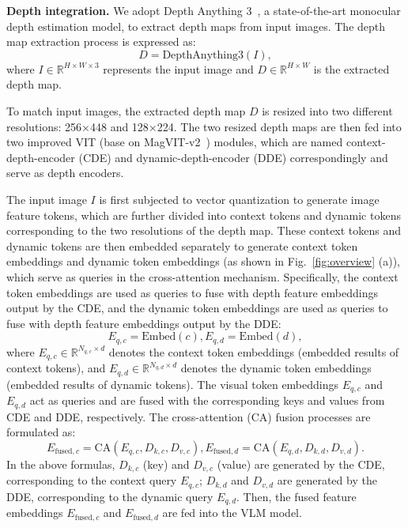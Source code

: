 \documentclass[runningheads]{llncs}
\begin{document}
\noindent\textbf{Depth integration.}
We adopt Depth Anything 3~\cite{lin2025depth3recoveringvisual}, a state-of-the-art monocular depth estimation model, to extract depth maps from input images. The depth map extraction process is expressed as:
\begin{equation}
D = \text{DepthAnything3}(I),
\end{equation}
where $I \in \mathbb{R}^{H \times W \times 3}$ represents the input image and $D \in \mathbb{R}^{H \times W}$ is the extracted depth map.

To match input images, the extracted depth map $D$ is resized into two different resolutions: 256×448 and 128×224. The two resized depth maps are then fed into two improved VIT (base on MagVIT-v2~\cite{yu2024magvitv2}) modules, which are named context-depth-encoder (CDE) and dynamic-depth-encoder (DDE) correspondingly and serve as depth encoders.

The input image $I$ is first subjected to vector quantization to generate image feature tokens, which are further divided into context tokens and dynamic tokens corresponding to the two resolutions of the depth map. These context tokens and dynamic tokens are then embedded separately to generate context token embeddings and dynamic token embeddings (as shown in Fig.~\ref{fig:overview} (a)), which serve as queries in the cross-attention mechanism. Specifically, the context token embeddings are used as queries to fuse with depth feature embeddings output by the CDE, and the dynamic token embeddings are used as queries to fuse with depth feature embeddings output by the DDE:
\begin{equation}
E_{q,c} = \text{Embed}(c), E_{q,d} = \text{Embed}(d),
\end{equation}
where $E_{q,c} \in \mathbb{R}^{N_{q,c} \times d}$ denotes the context token embeddings (embedded results of context tokens), and $E_{q,d} \in \mathbb{R}^{N_{q,d} \times d}$ denotes the dynamic token embeddings (embedded results of dynamic tokens).
The visual token embeddings $E_{q,c}$ and $E_{q,d}$ act as queries and are fused with the corresponding keys and values from CDE and DDE, respectively. The cross-attention (CA) fusion processes are formulated as:
\begin{equation}
E_{\text{fused},c} = \text{CA}(E_{q,c}, D_{k,c}, D_{v,c}),
E_{\text{fused},d} = \text{CA}(E_{q,d}, D_{k,d}, D_{v,d}).
\end{equation}
In the above formulas, $D_{k,c}$ (key) and $D_{v,c}$ (value) are generated by the CDE, corresponding to the context query $E_{q,c}$; $D_{k,d}$ and $D_{v,d}$ are generated by the DDE, corresponding to the dynamic query $E_{q,d}$. Then, the fused feature embeddings $E_{\text{fused},c}$ and $E_{\text{fused},d}$ are fed into the VLM model. 
\end{document}
